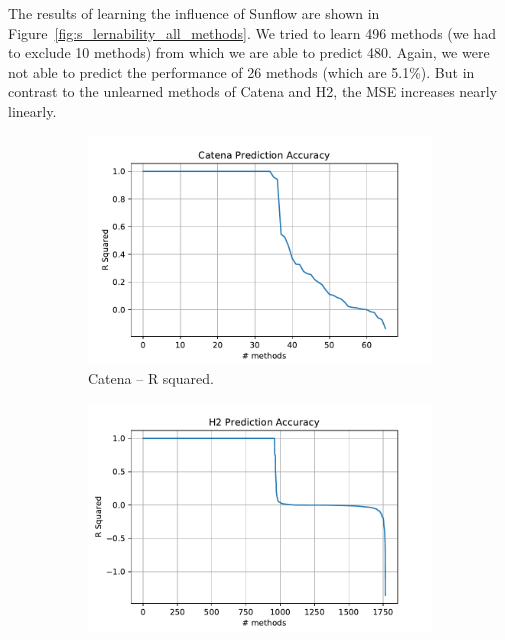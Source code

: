 The results of learning the influence of Sunflow are shown in Figure~\ref{fig:s_lernability_all_methods}. We tried to learn 496 methods (we had to exclude 10 methods) from which we are able to predict 480. Again, we were not able to predict the performance of 26 methods (which are 5.1\%). But in contrast to the unlearned methods of Catena and H2, the \ac{MSE} increases nearly linearly.


\begin{figure}[h]
	\centering
	\begin{subfigure}{.5\textwidth}
	  \centering
	  \includegraphics[width=.99\linewidth]{images/Catena_plt_learnable_func_all_model_r_sq}
	  \caption{Catena -- R squared.}
	  \label{fig:catena_model_r_sq}
	\end{subfigure}%
	\begin{subfigure}{.5\textwidth}
	  \centering
	  \includegraphics[width=.99\linewidth]{images/H2_plt_learnable_func_all_model_r_sq}

\end{subfigure}
\end{figure}
